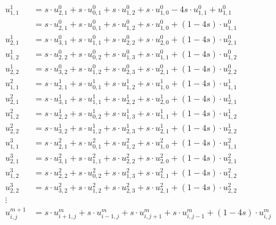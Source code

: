 \documentclass[11pt]{article}
\begin{document}
\begin{equation}
\begin{split} 
u_{1,1}^{1} &= s \cdot u_{2,1}^{0} + s \cdot u_{0,1}^{0} + s \cdot u_{1,2}^{0} + s \cdot u_{1,0}^{0} - 4 s \cdot u_{1,1}^{0} + u_{1,1}^{0} \\
&= s \cdot u_{2,1}^{0} + s \cdot u_{0,1}^{0} + s \cdot u_{1,2}^{0} + s \cdot u_{1,0}^{0}  + (1 - 4 s) \cdot u_{1,1}^{0} \\
u_{2,1}^{1} &= s \cdot u_{3,1}^{0} + s \cdot u_{1,1}^{0} + s \cdot u_{2,2}^{0} + s \cdot u_{2,0}^{0}  + (1 - 4 s) \cdot u_{2,1}^{0} \\
u_{1,2}^{1} &= s \cdot u_{2,2}^{0} + s \cdot u_{0,2}^{0} + s \cdot u_{1,3}^{0} + s \cdot u_{1,1}^{0}  + (1 - 4 s) \cdot u_{1,2}^{0} \\
u_{2,2}^{1} &= s \cdot u_{3,2}^{0} + s \cdot u_{1,2}^{0} + s \cdot u_{2,3}^{0} + s \cdot u_{2,1}^{0}  + (1 - 4 s) \cdot u_{2,2}^{0} \\
u_{1,1}^{2} &= s \cdot u_{2,1}^{1} + s \cdot u_{0,1}^{1} + s \cdot u_{1,2}^{1} + s \cdot u_{1,0}^{1}  + (1 - 4 s) \cdot u_{1,1}^{1} \\
u_{2,1}^{2} &= s \cdot u_{3,1}^{1} + s \cdot u_{1,1}^{1} + s \cdot u_{2,2}^{1} + s \cdot u_{2,0}^{1}  + (1 - 4 s) \cdot u_{2,1}^{1} \\
u_{1,2}^{2} &= s \cdot u_{2,2}^{1} + s \cdot u_{0,2}^{1} + s \cdot u_{1,3}^{1} + s \cdot u_{1,1}^{1}  + (1 - 4 s) \cdot u_{1,2}^{1} \\
u_{2,2}^{2} &= s \cdot u_{3,2}^{1} + s \cdot u_{1,2}^{1} + s \cdot u_{2,3}^{1} + s \cdot u_{2,1}^{1}  + (1 - 4 s) \cdot u_{2,2}^{1} \\
u_{1,1}^{3} &= s \cdot u_{2,1}^{2} + s \cdot u_{0,1}^{2} + s \cdot u_{1,2}^{2} + s \cdot u_{1,0}^{2}  + (1 - 4 s) \cdot u_{1,1}^{2} \\
u_{2,1}^{3} &= s \cdot u_{3,1}^{2} + s \cdot u_{1,1}^{2} + s \cdot u_{2,2}^{2} + s \cdot u_{2,0}^{2}  + (1 - 4 s) \cdot u_{2,1}^{2} \\
u_{1,2}^{3} &= s \cdot u_{2,2}^{2} + s \cdot u_{0,2}^{2} + s \cdot u_{1,3}^{2} + s \cdot u_{1,1}^{2}  + (1 - 4 s) \cdot u_{1,2}^{2} \\
u_{2,2}^{3} &= s \cdot u_{3,2}^{2} + s \cdot u_{1,2}^{2} + s \cdot u_{2,3}^{2} + s \cdot u_{2,1}^{2}  + (1 - 4 s) \cdot u_{2,2}^{2} \\
\vdots \\
u_{i,j}^{m + 1} &= s \cdot u_{i + 1 ,j}^m + s \cdot u_{i - 1 ,j}^m + s \cdot u_{i,j + 1}^m + s \cdot u_{i,j - 1}^m + (1 - 4 s) \cdot u_{i,j}^m  
\end{split}
\end{equation}
\end{document}
